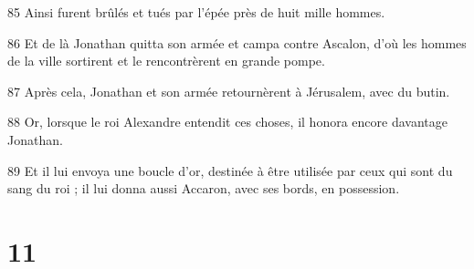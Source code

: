 \par 85 Ainsi furent brûlés et tués par l'épée près de huit mille hommes.
\par 86 Et de là Jonathan quitta son armée et campa contre Ascalon, d'où les hommes de la ville sortirent et le rencontrèrent en grande pompe.
\par 87 Après cela, Jonathan et son armée retournèrent à Jérusalem, avec du butin.
\par 88 Or, lorsque le roi Alexandre entendit ces choses, il honora encore davantage Jonathan.
\par 89 Et il lui envoya une boucle d'or, destinée à être utilisée par ceux qui sont du sang du roi ; il lui donna aussi Accaron, avec ses bords, en possession.

\chapter{11}

